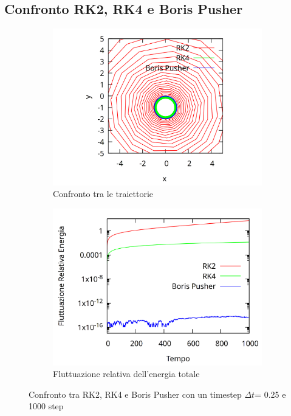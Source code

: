 \documentclass[11pt]{article}
\begin{document}
\subsection{Confronto RK2, RK4 e Boris Pusher}
\begin{figure}[ht]
\begin{subfigure}{.5\textwidth}
  \centering
  \includegraphics[width=.9\linewidth]{./img/confronto_traiettorie.png}  
  \caption{Confronto tra le traiettorie }
\end{subfigure}
\begin{subfigure}{.5\textwidth}
  \centering
  \includegraphics[width=.9\linewidth]{./img/erroreE.png}  
  \caption{Fluttuazione relativa dell'energia totale}
\end{subfigure}
\caption{Confronto tra RK2, RK4 e Boris Pusher con un timestep $\Delta t$= 0.25 e 1000 step}
\end{figure}
\end{document}

